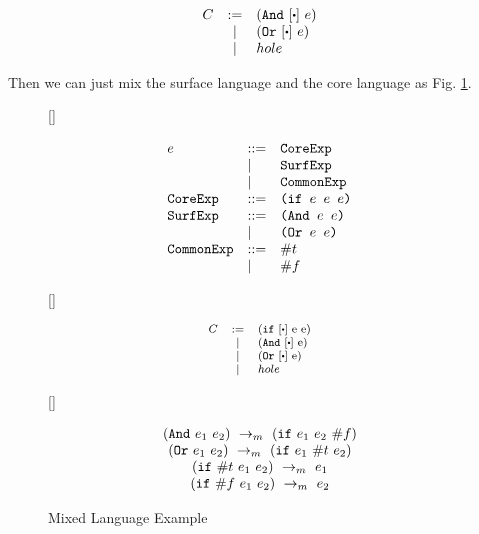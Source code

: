 \[
\begin{array}{lcl}
C &:=& (\m{And}~[\bigcdot]~e)\\
&|& (\m{Or}~[\bigcdot]~e)\\
&|&hole\\
\end{array}
\]

Then we can just mix the surface language and the core language as Fig. \ref{fig:mixexample}.

\begin{figure}[thb]
\centering
{}[\linewidth]{\footnotesize
\begin{flushleft}
\[
\begin{array}{lll}
e &::=& \mbox{\tt CoreExp} \\
&|&\mbox{\tt SurfExp}\\
&|&\mbox{\tt CommonExp}\\
\mbox{\tt CoreExp} &::=& \texttt{(if~$e$~$e$~$e$)}\\
\mbox{\tt SurfExp} &::=& \texttt{(And~$e$~$e$)}\\
&|&\texttt{(Or~$e$~$e$)}\\
\mbox{\tt CommonExp} &::=& \#t\\
&|& \#f\\
\end{array}
\]
\end{flushleft}

}
[\linewidth]{
\begin{flushleft}
\[\footnotesize
\begin{array}{lcl}
C &:=& (\m{if}~[\bigcdot]~$e$~$e$)\\
&|& (\m{And}~[\bigcdot]~$e$)\\
&|& (\m{Or}~[\bigcdot]~$e$)\\
&|&hole\\
\end{array}
\]
\end{flushleft}

}

[\linewidth]{\footnotesize
\begin{flushleft}
\[
\begin{array}{c}
(\mbox{\tt And}~e_1~e_2) ~\rightarrow_m~(\mbox{\tt if}~e_1~e_2~\#f)\\
(\mbox{\tt Or}~e_1~e_2) ~\rightarrow_m~(\mbox{\tt if}~e_1~\#t~e_2)\\
(\mbox{\tt if}~\#t~e_1~e_2) ~\rightarrow_m~e_1\\
(\mbox{\tt if}~\#f~e_1~e_2) ~\rightarrow_m~e_2 
\end{array}
\]
\end{flushleft}

}

\caption{Mixed Language Example}
\label{fig:mixexample}
\end{figure}

